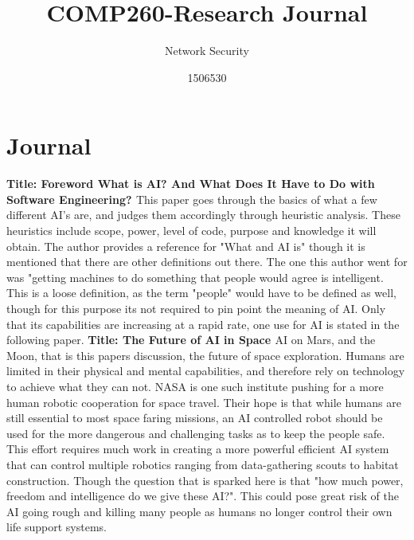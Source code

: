 \documentclass{scrartcl}
\title{COMP260-Research Journal}
\subtitle{Network Security}
\author{1506530}
\begin{document}
	
	
	\maketitle
	\section{Journal}
	
	\newline
	\newline
	\textbf{Title: Foreword What is AI? And What Does It Have to Do with Software Engineering? \cite{What}}
	\newline
This paper goes through the basics of what a few different AI's are, and judges them accordingly through heuristic analysis. These heuristics include scope, power, level of code, purpose and knowledge it will obtain. The author provides a reference for "What and AI is" though it is mentioned that there are other definitions out there. The one this author went for was "getting machines to do something that people would agree is intelligent. This is a loose definition, as the term "people" would have to be defined as well, though for this purpose its not required to pin point the meaning of AI. Only that its capabilities are increasing at a rapid rate, one use for AI is stated in the following paper.
	\newline
	\newline
	\newline
	\textbf{Title: The Future of AI in Space \cite{Space}}
	\newline
AI on Mars, and the Moon, that is this papers discussion, the future of space exploration. Humans are limited in their physical and mental capabilities, and therefore rely on technology to achieve what they can not. NASA is one such institute pushing for a more human robotic cooperation for space travel. Their hope is that while humans are still essential to most space faring missions, an AI controlled robot should be used for the more dangerous and challenging tasks as to keep the people safe. This effort requires much work in creating a more powerful efficient AI system that can control multiple robotics ranging from data-gathering scouts to habitat construction. Though the question that is sparked here is that "how much power, freedom and intelligence do we give these AI?". This could pose great risk of the AI going rough and killing many people as humans no longer control their own life support systems.
\end{document}
